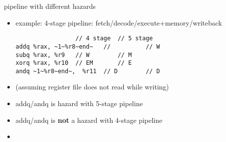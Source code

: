 \begin{frame}[fragile,label=diffHaz]{pipeline with different hazards}
    \begin{itemize}
        \item example: 4-stage pipeline: fetch/decode/execute+memory/writeback
\begin{lstlisting}
                 // 4 stage  // 5 stage
addq %rax, ~1~%r8~end~   //          // W
subq %rax, %r9   // W        // M
xorq %rax, %r10  // EM       // E
andq ~1~%r8~end~,  %r11  // D        // D
\end{lstlisting}
        \item<2> (assuming register file does not read while writing) 
        \item<2> addq/andq is hazard with 5-stage pipeline
        \item<2> addq/andq is \textbf{not} a hazard with 4-stage pipeline
        \item<3> 
    \end{itemize}
\end{frame}

